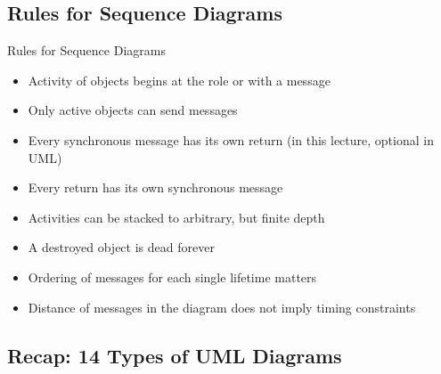 \subsection{Rules for Sequence Diagrams}
\begin{frame}{\insertsubsection}
	\begin{fancycolumns}
		\begin{note}{Rules for Sequence Diagrams}
			\begin{itemize}
				\item Activity of objects begins at the role or with a message
				\item Only active objects can send messages
				\item Every synchronous message has its own return (in this lecture, optional in UML)
				\item Every return has its own synchronous message
				\item Activities can be stacked to arbitrary, but finite depth
				\item A destroyed object is dead forever
				\item Ordering of messages for each single lifetime matters
				\item Distance of messages in the diagram does not imply timing constraints
			\end{itemize}
		\end{note}
	\end{fancycolumns}
\end{frame}

\subsection*{Recap: 14 Types of UML Diagrams}
\begin{frame}{\insertsubsection\ \mytitlesource{\umlspec}}
	\centering{}
\end{frame}

